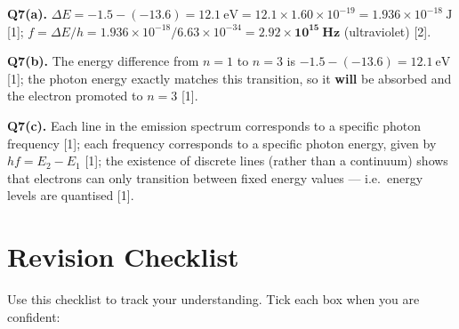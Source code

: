 \begin{markscheme}
\vspace{0.5em}\textbf{Q7(a).} $\Delta E = -1.5 - (-13.6) = 12.1\ \text{eV} = 12.1\times1.60\times10^{-19} = 1.936\times10^{-18}\ \text{J}$ [1]; $f = \Delta E/h = 1.936\times10^{-18}/6.63\times10^{-34} = \mathbf{2.92\times10^{15}\ \text{Hz}}$ (ultraviolet) [2].

\vspace{0.5em}\textbf{Q7(b).} The energy difference from $n=1$ to $n=3$ is $-1.5 - (-13.6) = 12.1\ \text{eV}$ [1]; the photon energy exactly matches this transition, so it \textbf{will} be absorbed and the electron promoted to $n=3$ [1].

\vspace{0.5em}\textbf{Q7(c).} Each line in the emission spectrum corresponds to a specific photon frequency [1]; each frequency corresponds to a specific photon energy, given by $hf = E_2 - E_1$ [1]; the existence of discrete lines (rather than a continuum) shows that electrons can only transition between fixed energy values — i.e.\ energy levels are quantised [1].

\end{markscheme}

\newpage
\section{Revision Checklist}

Use this checklist to track your understanding. Tick each box when you are confident:

